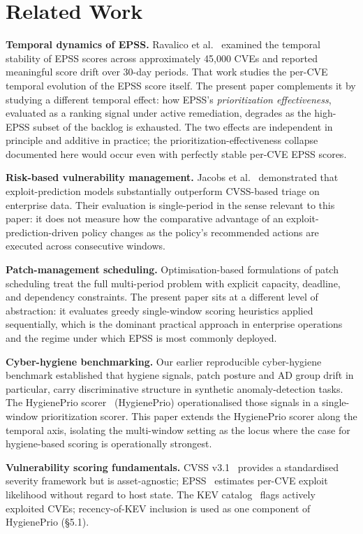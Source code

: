\section{Related Work}

\textbf{Temporal dynamics of EPSS.} Ravalico et al.~\cite{ravalico2025epsstemporal} examined the temporal stability of EPSS scores across approximately 45{,}000 CVEs and reported meaningful score drift over 30-day periods. That work studies the per-CVE temporal evolution of the EPSS score itself. The present paper complements it by studying a different temporal effect: how EPSS's \textit{prioritization effectiveness}, evaluated as a ranking signal under active remediation, degrades as the high-EPSS subset of the backlog is exhausted. The two effects are independent in principle and additive in practice; the prioritization-effectiveness collapse documented here would occur even with perfectly stable per-CVE EPSS scores.

\textbf{Risk-based vulnerability management.} Jacobs et al.~\cite{jacobs2020improving} demonstrated that exploit-prediction models substantially outperform CVSS-based triage on enterprise data. Their evaluation is single-period in the sense relevant to this paper: it does not measure how the comparative advantage of an exploit-prediction-driven policy changes as the policy's recommended actions are executed across consecutive windows.

\textbf{Patch-management scheduling.} Optimisation-based formulations of patch scheduling treat the full multi-period problem with explicit capacity, deadline, and dependency constraints. The present paper sits at a different level of abstraction: it evaluates greedy single-window scoring heuristics applied sequentially, which is the dominant practical approach in enterprise operations and the regime under which EPSS is most commonly deployed.

\textbf{Cyber-hygiene benchmarking.} Our earlier reproducible cyber-hygiene benchmark established that hygiene signals, patch posture and AD group drift in particular, carry discriminative structure in synthetic anomaly-detection tasks. The HygienePrio scorer~\cite{paper4hygieneprio} (HygienePrio) operationalised those signals in a single-window prioritization scorer. This paper extends the HygienePrio scorer along the temporal axis, isolating the multi-window setting as the locus where the case for hygiene-based scoring is operationally strongest.

\textbf{Vulnerability scoring fundamentals.} CVSS v3.1~\cite{first2019cvss} provides a standardised severity framework but is asset-agnostic; EPSS~\cite{jacobs2021epss} estimates per-CVE exploit likelihood without regard to host state. The KEV catalog~\cite{cisa2026kev} flags actively exploited CVEs; recency-of-KEV inclusion is used as one component of HygienePrio (\S5.1).

